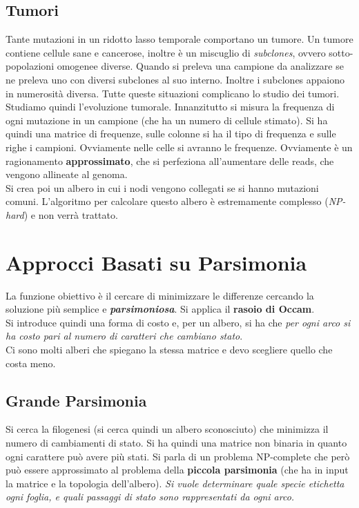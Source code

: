 \documentclass[a4paper,12pt, oneside]{book}
\begin{document}
\subsection{Tumori}
Tante mutazioni in un ridotto lasso temporale comportano un tumore.
Un tumore contiene cellule sane e cancerose, inoltre è un miscuglio di
\textit{subclones}, ovvero sotto-popolazioni omogenee diverse. Quando
si preleva una campione da analizzare se ne preleva uno con diversi
subclones al suo interno. Inoltre i subclones appaiono in numerosità
diversa. Tutte queste situazioni complicano lo studio dei tumori.\\
Studiamo quindi l'evoluzione tumorale. Innanzitutto si misura la
frequenza di ogni mutazione in un campione (che ha un numero di
cellule stimato). Si ha quindi una matrice di frequenze, sulle colonne
si ha il tipo di frequenza e sulle righe i campioni. Ovviamente nelle
celle si avranno le frequenze. Ovviamente è un ragionamento
\textbf{approssimato}, che si perfeziona all'aumentare delle reads,
che vengono allineate al genoma.\\
Si crea poi un albero in cui i nodi vengono collegati se si hanno
mutazioni comuni. L'algoritmo per calcolare questo albero è
estremamente complesso (\textit{NP-hard}) e non verrà trattato. 
\section{Approcci Basati su Parsimonia}
La funzione obiettivo è il cercare di minimizzare le differenze
cercando la soluzione più semplice e \textbf{\textit{parsimoniosa}}.
Si applica il \textbf{rasoio di Occam}.\\
Si introduce quindi una forma di costo e, per un albero, si ha che
\textit{per ogni arco si ha costo pari al numero di caratteri che
  cambiano stato}.\\
Ci sono molti alberi che spiegano la stessa matrice e devo scegliere
quello che costa meno.
\subsection{Grande Parsimonia}
Si cerca la filogenesi (si cerca quindi un albero sconosciuto)
che minimizza il numero di cambiamenti di stato. Si ha quindi una
matrice non binaria in quanto ogni carattere può avere più stati. Si
parla di un problema NP-complete che però può essere approssimato al
problema della \textbf{piccola parsimonia} (che ha in input la matrice
e la topologia dell'albero). \textit{Si vuole determinare
  quale specie etichetta ogni foglia, e quali passaggi di stato sono
  rappresentati da ogni arco.}
\end{document}
